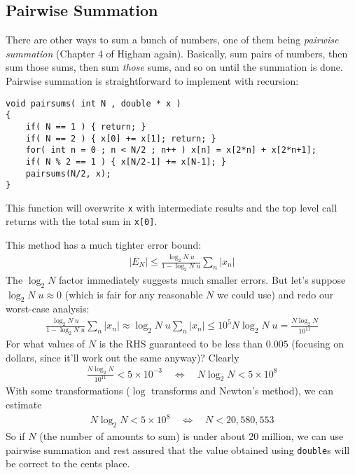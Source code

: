 \documentclass[11pt, oneside]{amsart}   	%
\begin{document}
\subsection{Pairwise Summation}

There are other ways to sum a bunch of numbers, one of them being {\em pairwise summation} (Chapter 4 of Higham again). Basically, sum pairs of numbers, then sum those sums, then sum {\em those} sums, and so on until the summation is done. Pairwise summation is straightforward to implement with recursion: 
\begin{verbatim}
void pairsums( int N , double * x )
{
    if( N == 1 ) { return; }
    if( N == 2 ) { x[0] += x[1]; return; }
    for( int n = 0 ; n < N/2 ; n++ ) x[n] = x[2*n] + x[2*n+1];
    if( N % 2 == 1 ) { x[N/2-1] += x[N-1]; }
    pairsums(N/2, x);
}
\end{verbatim}
This function will overwrite \texttt{x} with intermediate results and the top level call returns with the total sum in \texttt{x[0]}. 

This method has a much tighter error bound: 
\begin{align*}
    | E_N | \leq \frac{\log_2N \; u}{1-\log_2N \; u} \sum_n |x_n|
\end{align*}
The $\log_2N$ factor immediately suggests much smaller errors. But let's suppose $\log_2N \; u \approx 0$ (which is fair for any reasonable $N$ we could use) and redo our worst-case analysis: 
\begin{align*}
    \frac{\log_2N \; u}{1-\log_2N \; u} \sum_n |x_n|
        \approx \log_2N \; u \sum_n |x_n|
        \leq 10^5 N \log_2N \; u 
        = \frac{N \log_2N}{10^{11}}
\end{align*}
For what values of $N$ is the RHS guaranteed to be less than $0.005$ (focusing on dollars, since it'll work out the same anyway)? Clearly
\begin{align*}
    \frac{N \log_2N}{10^{11}} < 5 \times 10^{-3}
    \quad\iff\quad
    N \log_2N < 5 \times 10^{8}
\end{align*}
With some transformations ($\log$ transforms and Newton's method), we can estimate 
\begin{align*}
    N \log_2N < 5 \times 10^{8}
    \quad\iff\quad 
    N < 20,580,553
\end{align*}
So if $N$ (the number of amounts to sum) is under about 20 million, we can use pairwise summation and rest assured that the value obtained using \texttt{double}s will be correct to the cents place.  
\end{document}
